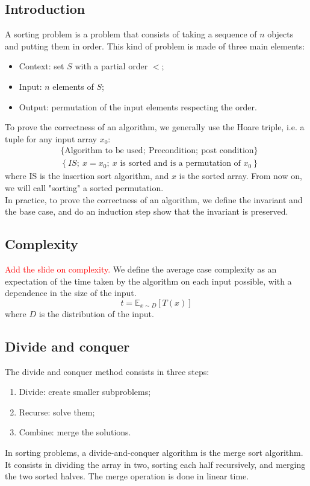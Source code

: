 \documentclass[12pt, openany]{report}
\theoremstyle{definition}
\begin{document}
\subsection{Introduction}
A sorting problem is a problem that consists of taking a sequence of $n$ objects and putting them in order. This kind of problem is made of three main elements:
\begin{itemize}
  \item Context: set $S$ with a partial order $<$;
  \item Input: $n$ elements of $S$;
  \item Output: permutation of the input elements respecting the order.
\end{itemize}
To prove the correctness of an algorithm, we generally use the Hoare triple, i.e. a tuple for any input array $x_0$:
\begin{equation}
  \begin{aligned}
	&\{\text{Algorithm to be used};\ \text{Precondition}; \ \text{post condition}\}\\
	&\left\{IS;\ x=x_0;\ x\text{ is sorted and is a permutation of }x_0\right\}
\end{aligned}
\end{equation}
where IS is the insertion sort algorithm, and $x$ is the sorted array. From now on, we will call "sorting" a sorted permutation. \\
In practice, to prove the correctness of an algorithm, we define the invariant and the base case, and do an induction step show that the invariant is preserved.\\
\subsection{Complexity}
\textcolor{red}{Add the slide on complexity.}
We define the average case complexity as an expectation of the time taken by the algorithm on each input possible, with a dependence in the size of the input.
\begin{equation}
	t = \mathbb{E}_{x\sim D}[T(x)]
\end{equation}
where $D$ is the distribution of the input.\\
\subsection{Divide and conquer}
The divide and conquer method consists in three steps:
\begin{enumerate}
	\item Divide: create smaller subproblems;
	\item Recurse: solve them;
	\item Combine: merge the solutions.
\end{enumerate}
In sorting problems, a divide-and-conquer algorithm is the merge sort algorithm. It consists in dividing the array in two, sorting each half recursively, and merging the two sorted halves. The merge operation is done in linear time.\\
\end{document}
